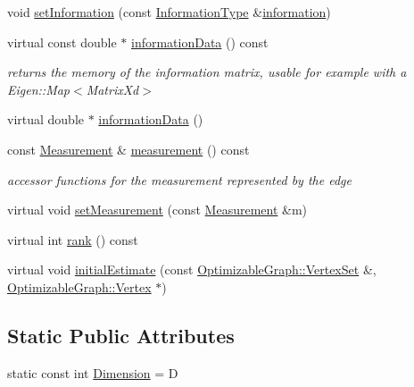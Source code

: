 \begin{DoxyCompactItemize}
\item 
void \hyperlink{classg2o_1_1BaseEdge_a9bb871a94d2413ec3113a147417f2dc4}{set\+Information} (const \hyperlink{classg2o_1_1BaseEdge_a2e5a33343ac3f189d8a7d5ee4d8b73fc}{Information\+Type} \&\hyperlink{classg2o_1_1BaseEdge_ab682086df7223ce2b039d652416ddc23}{information})
\item 
virtual const double $\ast$ \hyperlink{classg2o_1_1BaseEdge_a49791e1acda790a7819388e60d80ed50}{information\+Data} () const 
\begin{DoxyCompactList}\small\item\em returns the memory of the information matrix, usable for example with a Eigen\+::\+Map$<$\+Matrix\+Xd$>$ \end{DoxyCompactList}\item 
virtual double $\ast$ \hyperlink{classg2o_1_1BaseEdge_a72ae9d215d6abc892f735e3d3ab81a88}{information\+Data} ()
\item 
const \hyperlink{classg2o_1_1BaseEdge_a2c148abba650a20b8c7eed75d3e2211e}{Measurement} \& \hyperlink{classg2o_1_1BaseEdge_a8c20e7ffa66bb7a4a02c8cee82e89c8b}{measurement} () const 
\begin{DoxyCompactList}\small\item\em accessor functions for the measurement represented by the edge \end{DoxyCompactList}\item 
virtual void \hyperlink{classg2o_1_1BaseEdge_a24aae7b4fc35d311158f104cfdd95aeb}{set\+Measurement} (const \hyperlink{classg2o_1_1BaseEdge_a2c148abba650a20b8c7eed75d3e2211e}{Measurement} \&m)
\item 
virtual int \hyperlink{classg2o_1_1BaseEdge_a56269f26521052cf52de8a61c37e4c29}{rank} () const 
\item 
virtual void \hyperlink{classg2o_1_1BaseEdge_a0c3d9763f1dc504627df75e0f381ca70}{initial\+Estimate} (const \hyperlink{classg2o_1_1HyperGraph_a703938cdb4bb636860eed55a2489d70c}{Optimizable\+Graph\+::\+Vertex\+Set} \&, \hyperlink{classg2o_1_1OptimizableGraph_1_1Vertex}{Optimizable\+Graph\+::\+Vertex} $\ast$)
\end{DoxyCompactItemize}
\subsection*{Static Public Attributes}
\begin{DoxyCompactItemize}
\item 
static const int \hyperlink{classg2o_1_1BaseEdge_ab4812acb21e0b9de80dc6d676e71cb70}{Dimension} = D
\end{DoxyCompactItemize}
